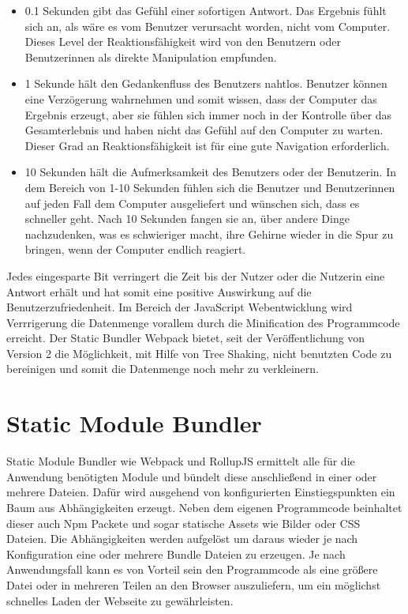 \begin{itemize}
\item 0.1 Sekunden gibt das Gefühl einer sofortigen Antwort. Das Ergebnis fühlt sich an, als wäre es vom Benutzer verursacht worden, nicht vom Computer. Dieses Level der Reaktionsfähigkeit wird von den Benutzern oder Benutzerinnen als direkte Manipulation empfunden.
\item 1 Sekunde hält den Gedankenfluss des Benutzers nahtlos. Benutzer können eine Verzögerung wahrnehmen und somit wissen, dass der Computer das Ergebnis erzeugt, aber sie fühlen sich immer noch in der Kontrolle über das Gesamterlebnis und haben nicht das Gefühl auf den Computer zu warten. Dieser Grad an Reaktionsfähigkeit ist für eine gute Navigation erforderlich.
\item 10 Sekunden hält die Aufmerksamkeit des Benutzers oder der Benutzerin. In dem Bereich von 1-10 Sekunden fühlen sich die Benutzer und Benutzerinnen auf jeden Fall dem Computer ausgeliefert und wünschen sich, dass es schneller geht. Nach 10 Sekunden fangen sie an, über andere Dinge nachzudenken, was es schwieriger macht, ihre Gehirne wieder in die Spur zu bringen, wenn der Computer endlich reagiert.
\end{itemize}

Jedes eingesparte Bit verringert die Zeit bis der Nutzer oder die Nutzerin eine Antwort erhält und hat somit eine positive Auswirkung auf die Benutzerzufriedenheit. Im Bereich der JavaScript Webentwicklung wird Verrrigerung die Datenmenge vorallem durch die Minification des Programmcode erreicht. Der Static Bundler Webpack bietet, seit der Veröffentlichung von Version 2 die Möglichkeit, mit Hilfe von Tree Shaking, nicht benutzten Code zu bereinigen und somit die Datenmenge noch mehr zu verkleinern. \autocite{WebpackTreeShaking}


\section{Static Module Bundler}
Static Module Bundler wie Webpack und RollupJS ermittelt alle für die Anwendung benötigten Module und bündelt diese anschließend in einer oder mehrere Dateien. Dafür wird ausgehend von konfigurierten Einstiegspunkten ein Baum aus Abhängigkeiten erzeugt. Neben dem eigenen Programmcode beinhaltet dieser auch Npm Packete und sogar statische Assets wie Bilder oder CSS Dateien. Die Abhängigkeiten werden aufgelöst um daraus wieder je nach Konfiguration eine oder mehrere Bundle Dateien zu erzeugen. Je nach Anwendungsfall kann es von Vorteil sein den Programmcode als eine größere Datei oder in mehreren Teilen an den Browser auszuliefern, um ein möglichst schnelles Laden der Webseite zu gewährleisten.
\autocite{RollupJSDocs,WebpackConcepts}

